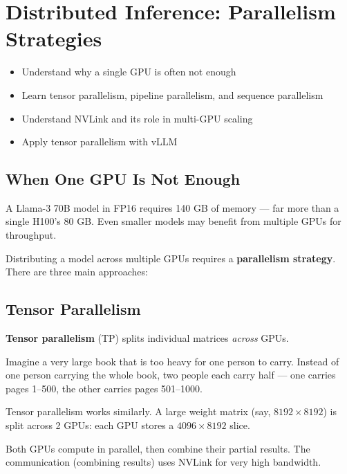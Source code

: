 \documentclass[11pt, twoside, openright]{book}
\newcommand{\analogybox}[2]{\begin{tcolorbox}[analogystyle, title={Analogy: #1}]#2\end{tcolorbox}}
\newenvironment{learningobjectives}
  {\begin{tcolorbox}[enhanced, breakable,
    colback={rgb,255:red,232;green,240;blue,255},
    colframe=NavyBlue, boxrule=1.5pt, arc=4pt,
    title={\bfseries Learning Objectives},
    fonttitle=\bfseries\color{white},
    attach boxed title to top left={yshift=-2mm, xshift=5mm},
    boxed title style={colback=NavyBlue, arc=2pt}]
  \begin{itemize}[leftmargin=1.5em, itemsep=2pt]}
  {\end{itemize}\end{tcolorbox}}
\newcommand{\keyterm}[1]{\textbf{\color{AccentOrange}#1}}
\begin{document}
\chapter{Distributed Inference: Parallelism Strategies}
\label{ch:distributed}

\begin{learningobjectives}
  \item Understand why a single GPU is often not enough
  \item Learn tensor parallelism, pipeline parallelism, and sequence parallelism
  \item Understand NVLink and its role in multi-GPU scaling
  \item Apply tensor parallelism with vLLM
\end{learningobjectives}

\section{When One GPU Is Not Enough}

A Llama-3 70B model in FP16 requires 140 GB of memory --- far more than a single
H100's 80 GB.  Even smaller models may benefit from multiple GPUs for throughput.

Distributing a model across multiple GPUs requires a \textbf{parallelism strategy}.
There are three main approaches:

\section{Tensor Parallelism}

\keyterm{Tensor parallelism} (TP) splits individual matrices \textit{across} GPUs.

\analogybox{The Heavy Book}{
Imagine a very large book that is too heavy for one person to carry.
Instead of one person carrying the whole book, two people each carry half ---
one carries pages 1--500, the other carries pages 501--1000.

Tensor parallelism works similarly.  A large weight matrix (say, $8192 \times 8192$)
is split across 2 GPUs: each GPU stores a $4096 \times 8192$ slice.

Both GPUs compute in parallel, then combine their partial results.  The
communication (combining results) uses NVLink for very high bandwidth.
}
\end{document}
